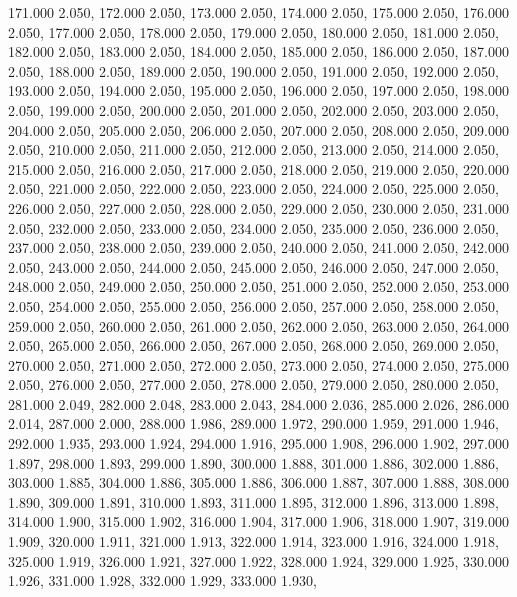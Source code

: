 171.000 2.050, 
172.000 2.050, 
173.000 2.050, 
174.000 2.050, 
175.000 2.050, 
176.000 2.050, 
177.000 2.050, 
178.000 2.050, 
179.000 2.050, 
180.000 2.050, 
181.000 2.050, 
182.000 2.050, 
183.000 2.050, 
184.000 2.050, 
185.000 2.050, 
186.000 2.050, 
187.000 2.050, 
188.000 2.050, 
189.000 2.050, 
190.000 2.050, 
191.000 2.050, 
192.000 2.050, 
193.000 2.050, 
194.000 2.050, 
195.000 2.050, 
196.000 2.050, 
197.000 2.050, 
198.000 2.050, 
199.000 2.050, 
200.000 2.050, 
201.000 2.050, 
202.000 2.050, 
203.000 2.050, 
204.000 2.050, 
205.000 2.050, 
206.000 2.050, 
207.000 2.050, 
208.000 2.050, 
209.000 2.050, 
210.000 2.050, 
211.000 2.050, 
212.000 2.050, 
213.000 2.050, 
214.000 2.050, 
215.000 2.050, 
216.000 2.050, 
217.000 2.050, 
218.000 2.050, 
219.000 2.050, 
220.000 2.050, 
221.000 2.050, 
222.000 2.050, 
223.000 2.050, 
224.000 2.050, 
225.000 2.050, 
226.000 2.050, 
227.000 2.050, 
228.000 2.050, 
229.000 2.050, 
230.000 2.050, 
231.000 2.050, 
232.000 2.050, 
233.000 2.050, 
234.000 2.050, 
235.000 2.050, 
236.000 2.050, 
237.000 2.050, 
238.000 2.050, 
239.000 2.050, 
240.000 2.050, 
241.000 2.050, 
242.000 2.050, 
243.000 2.050, 
244.000 2.050, 
245.000 2.050, 
246.000 2.050, 
247.000 2.050, 
248.000 2.050, 
249.000 2.050, 
250.000 2.050, 
251.000 2.050, 
252.000 2.050, 
253.000 2.050, 
254.000 2.050, 
255.000 2.050, 
256.000 2.050, 
257.000 2.050, 
258.000 2.050, 
259.000 2.050, 
260.000 2.050, 
261.000 2.050, 
262.000 2.050, 
263.000 2.050, 
264.000 2.050, 
265.000 2.050, 
266.000 2.050, 
267.000 2.050, 
268.000 2.050, 
269.000 2.050, 
270.000 2.050, 
271.000 2.050, 
272.000 2.050, 
273.000 2.050, 
274.000 2.050, 
275.000 2.050, 
276.000 2.050, 
277.000 2.050, 
278.000 2.050, 
279.000 2.050, 
280.000 2.050, 
281.000 2.049, 
282.000 2.048, 
283.000 2.043, 
284.000 2.036, 
285.000 2.026, 
286.000 2.014, 
287.000 2.000, 
288.000 1.986, 
289.000 1.972, 
290.000 1.959, 
291.000 1.946, 
292.000 1.935, 
293.000 1.924, 
294.000 1.916, 
295.000 1.908, 
296.000 1.902, 
297.000 1.897, 
298.000 1.893, 
299.000 1.890, 
300.000 1.888, 
301.000 1.886, 
302.000 1.886, 
303.000 1.885, 
304.000 1.886, 
305.000 1.886, 
306.000 1.887, 
307.000 1.888, 
308.000 1.890, 
309.000 1.891, 
310.000 1.893, 
311.000 1.895, 
312.000 1.896, 
313.000 1.898, 
314.000 1.900, 
315.000 1.902, 
316.000 1.904, 
317.000 1.906, 
318.000 1.907, 
319.000 1.909, 
320.000 1.911, 
321.000 1.913, 
322.000 1.914, 
323.000 1.916, 
324.000 1.918, 
325.000 1.919, 
326.000 1.921, 
327.000 1.922, 
328.000 1.924, 
329.000 1.925, 
330.000 1.926, 
331.000 1.928, 
332.000 1.929, 
333.000 1.930, 
